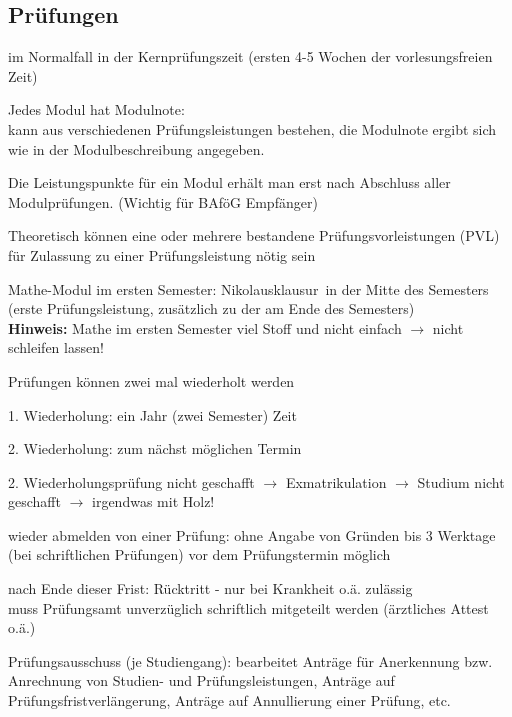\documentclass[a4paper,12pt]{report}
\begin{document}
\subsection{Prüfungen}
\begin{itemize*}
    \item im Normalfall in der Kernprüfungszeit (ersten 4-5 Wochen der vorlesungsfreien Zeit)
    \item Jedes Modul hat Modulnote:\\
        kann aus verschiedenen Prüfungsleistungen bestehen, die Modulnote ergibt sich wie in der Modulbeschreibung angegeben.
    \item Die Leistungspunkte für ein Modul erhält man erst nach Abschluss aller Modulprüfungen. (Wichtig für BAföG Empfänger)
    \item Theoretisch können eine oder mehrere bestandene Prüfungsvorleistungen (PVL) für Zulassung zu einer Prüfungsleistung nötig sein\\
    \item Mathe-Modul im ersten Semester: \glqq Nikolausklausur\grqq\ in der Mitte des Semesters (erste Prüfungsleistung, zusätzlich zu der am Ende des Semesters)\\
    \textbf{Hinweis:} Mathe im ersten Semester viel Stoff und nicht einfach $\rightarrow$ nicht schleifen lassen!
    \item Prüfungen können zwei mal wiederholt werden
    \begin{itemize*}
        \item 1. Wiederholung: ein Jahr (zwei Semester) Zeit
        \item 2. Wiederholung: zum nächst möglichen Termin
    \end{itemize*}
    2. Wiederholungsprüfung nicht geschafft $\rightarrow$ Exmatrikulation $\rightarrow$ Studium nicht geschafft $\rightarrow$ irgendwas mit Holz!
    \item wieder abmelden von einer Prüfung: ohne Angabe von Gründen bis 3 Werktage (bei schriftlichen Prüfungen) vor dem Prüfungstermin möglich
    \item nach Ende dieser Frist: Rücktritt - nur bei Krankheit o.ä. zulässig\\
        muss Prüfungsamt unverzüglich schriftlich mitgeteilt werden (ärztliches Attest o.ä.)
    \item Prüfungsausschuss (je Studiengang): bearbeitet Anträge für Anerkennung bzw. Anrechnung von Studien- und Prüfungsleistungen, Anträge auf Prüfungsfristverlängerung, Anträge auf Annullierung einer Prüfung, etc.

\end{itemize*}
\end{document}
